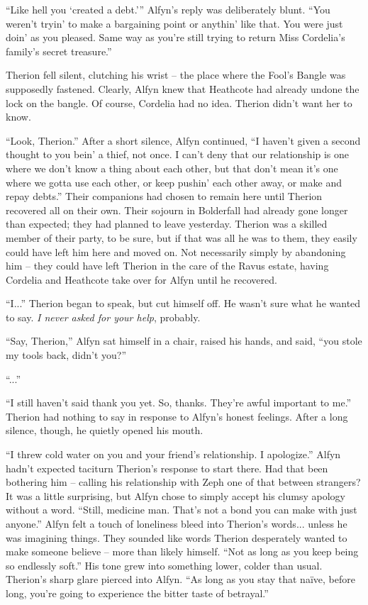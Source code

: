 ``Like hell you `created a debt.''' Alfyn's reply was deliberately blunt. ``You weren't tryin' to make a bargaining point or anythin' like that. You were just doin' as you pleased. Same way as you're still trying to return Miss Cordelia's family's secret treasure.''

Therion fell silent, clutching his wrist -- the place where the Fool's Bangle was supposedly fastened. Clearly, Alfyn knew that Heathcote had already undone the lock on the bangle. Of course, Cordelia had no idea. Therion didn't want her to know.

``Look, Therion.'' After a short silence, Alfyn continued, ``I haven't given a second thought to you bein' a thief, not once. I can't deny that our relationship is one where we don't know a thing about each other, but that don't mean it's one where we gotta use each other, or keep pushin' each other away, or make and repay debts.'' Their companions had chosen to remain here until Therion recovered all on their own. Their sojourn in Bolderfall had already gone longer than expected; they had planned to leave yesterday. Therion was a skilled member of their party, to be sure, but if that was all he was to them, they easily could have left him here and moved on. Not necessarily simply by abandoning him -- they could have left Therion in the care of the Ravus estate, having Cordelia and Heathcote take over for Alfyn until he recovered.

``I...'' Therion began to speak, but cut himself off. He wasn't sure what he wanted to say. \emph{I never asked for your help}, probably.

``Say, Therion,'' Alfyn sat himself in a chair, raised his hands, and said, ``you stole my tools back, didn't you?''

``...''

``I still haven't said thank you yet. So, thanks. They're awful important to me.'' Therion had nothing to say in response to Alfyn's honest feelings. After a long silence, though, he quietly opened his mouth.

``I threw cold water on you and your friend's relationship. I apologize.'' Alfyn hadn't expected taciturn Therion's response to start there. Had that been bothering him -- calling his relationship with Zeph one of that between strangers? It was a little surprising, but Alfyn chose to simply accept his clumsy apology without a word. ``Still, medicine man. That's not a bond you can make with just anyone.'' Alfyn felt a touch of loneliness bleed into Therion's words... unless he was imagining things. They sounded like words Therion desperately wanted to make someone believe -- more than likely himself. ``Not as long as you keep being so endlessly soft.'' His tone grew into something lower, colder than usual. Therion's sharp glare pierced into Alfyn. ``As long as you stay that naïve, before long, you're going to experience the bitter taste of betrayal.''

